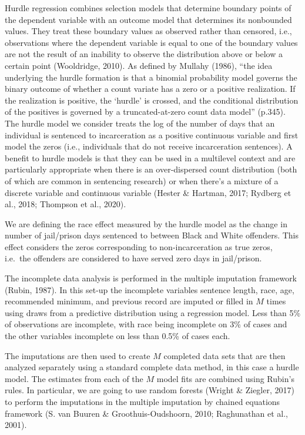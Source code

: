\documentclass[
  letterpaper,
  DIV=11,
  numbers=noendperiod]{scrartcl}
\begin{document}
Hurdle regression combines selection models that determine boundary
points of the dependent variable with an outcome model that determines
its nonbounded values. They treat these boundary values as observed
rather than censored, i.e., observations where the dependent variable is
equal to one of the boundary values are not the result of an inability
to observe the distribution above or below a certain point (Wooldridge,
2010). As defined by Mullahy (1986), ``the idea underlying the hurdle
formation is that a binomial probability model governs the binary
outcome of whether a count variate has a zero or a positive realization.
If the realization is positive, the `hurdle' is crossed, and the
conditional distribution of the positives is governed by a
truncated-at-zero count data model'' (p.345). The hurdle model we
consider treats the log of the number of days that an individual is
sentenced to incarceration as a positive continuous variable and first
model the zeros (i.e., individuals that do not receive incarceration
sentences). A benefit to hurdle models is that they can be used in a
multilevel context and are particularly appropriate when there is an
over-dispersed count distribution (both of which are common in
sentencing research) or when there's a mixture of a discrete variable
and continuous variable (Hester \& Hartman, 2017; Rydberg et al., 2018;
Thompson et al., 2020).

We are defining the race effect measured by the hurdle model as the
change in number of jail/prison days sentenced to between Black and
White offenders. This effect considers the zeros corresponding to
non-incarceration as true zeros, i.e.~the offenders are considered to
have served zero days in jail/prison.

The incomplete data analysis is performed in the multiple imputation
framework (Rubin, 1987). In this set-up the incomplete variables
sentence length, race, age, recommended minimum, and previous record are
imputed or filled in \(M\) times using draws from a predictive
distribution using a regression model. Less than 5\% of observations are
incomplete, with race being incomplete on 3\% of cases and the other
variables incomplete on less than 0.5\% of cases each.

The imputations are then used to create \(M\) completed data sets that
are then analyzed separately using a standard complete data method, in
this case a hurdle model. The estimates from each of the \(M\) model
fits are combined using Rubin's rules. In particular, we are going to
use random forests (Wright \& Ziegler, 2017) to perform the imputations
in the multiple imputation by chained equations framework (S. van Buuren
\& Groothuis-Oudshoorn, 2010; Raghunathan et al., 2001).
\end{document}
